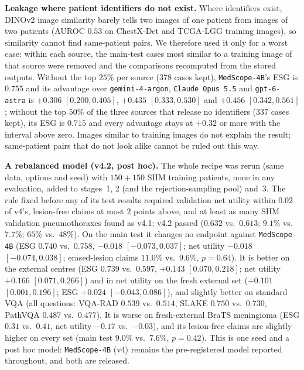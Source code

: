 \documentclass[5p,times,twocolumn,authoryear]{elsarticle}
\begin{document}
\textbf{Leakage where patient identifiers do not exist.} Where identifiers exist, DINOv2 image similarity barely tells two images of one patient from images of two patients (AUROC $0.53$ on ChestX-Det and TCGA-LGG training images), so similarity cannot find same-patient pairs. We therefore used it only for a worst case: within each source, the main-test cases most similar to a training image of that source were removed and the comparisons recomputed from the stored outputs. Without the top $25\%$ per source ($378$ cases kept), \texttt{MedScope-4B}'s ESG is $0.755$ and its advantage over \texttt{gemini-4-argon}, \texttt{Claude Opus 5.5} and \texttt{gpt-6-astra} is $+0.306$ $[0.200, 0.405]$, $+0.435$ $[0.333, 0.530]$ and $+0.456$ $[0.342, 0.561]$; without the top $50\%$ of the three sources that release no identifiers ($337$ cases kept), its ESG is $0.715$ and every advantage stays at $+0.32$ or more with the interval above zero. Images similar to training images do not explain the result; same-patient pairs that do not look alike cannot be ruled out this way.

\textbf{A rebalanced model (v4.2, post hoc).} The whole recipe was rerun (same data, options and seed) with $150 + 150$ SIIM training patients, none in any evaluation, added to stages~1, 2 (and the rejection-sampling pool) and~3. The rule fixed before any of its test results required validation net utility within $0.02$ of v4's, lesion-free claims at most $2$ points above, and at least as many SIIM validation pneumothoraxes found as v4.1; v4.2 passed ($0.632$ vs.\ $0.613$; $9.1\%$ vs.\ $7.7\%$; $65\%$ vs.\ $48\%$). On the main test it changes no endpoint against \texttt{MedScope-4B} (ESG $0.740$ vs.\ $0.758$, $-0.018$ $[-0.073, 0.037]$; net utility $-0.018$ $[-0.074, 0.038]$; erased-lesion claims $11.0\%$ vs.\ $9.6\%$, $p = 0.64$). It is better on the external centres (ESG $0.739$ vs.\ $0.597$, $+0.143$ $[0.070, 0.218]$; net utility $+0.166$ $[0.071, 0.266]$) and in net utility on the fresh external set ($+0.101$ $[0.001, 0.196]$; ESG $+0.024$ $[-0.043, 0.086]$), and slightly better on standard VQA (all questions: VQA-RAD $0.539$ vs.\ $0.514$, SLAKE $0.750$ vs.\ $0.730$, PathVQA $0.487$ vs.\ $0.477$). It is worse on fresh-external BraTS meningioma (ESG $0.31$ vs.\ $0.41$, net utility $-0.17$ vs.\ $-0.03$), and its lesion-free claims are slightly higher on every set (main test $9.0\%$ vs.\ $7.6\%$, $p = 0.42$). This is one seed and a post hoc model: \texttt{MedScope-4B} (v4) remains the pre-registered model reported throughout, and both are released.
\end{document}
